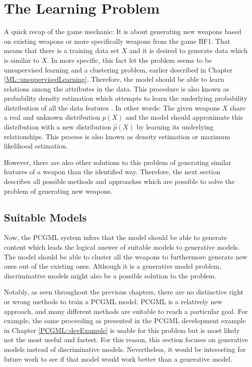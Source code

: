 \documentclass[MGS,Master,english]{twbook}%
\begin{document}
\section{The Learning Problem}
A quick recap of the game mechanic: It is about generating new weapons based on existing weapons or more specifically weapons from the game \ac{BF1}. That means that there is a training data set $X$ and it is desired to generate data which is similar to $X$. In more specific, this fact let the problem seems to be unsupervised learning and a clustering problem, earlier described in Chapter \ref{ML::unsupervisedLearning}. Therefore, the model should be able to learn relations among the attributes in the data. This procedure is also known as probability density estimation which attempts to learn the underlying probability distribution of all the data features \cite{ml::vae::tutorial}. In other words: The given weapons $X$ share a real and unknown distribution $p(X)$ and the model should approximate this distribution with a new distribution $\hat{p}(X)$ by learning its underlying relationships. This process is also known as density estimation or maximum likelihood estimation. 

However, there are also other solutions to this problem of generating similar features of a weapon than the identified way. Therefore, the next section describes all possible methods and approaches which are possible to solve the problem of generating new weapons.

\subsection{Suitable Models}
Now, the PCGML system infers that the model should be able to generate content which leads the logical answer of suitable models to generative models. The model should be able to cluster all the weapons to furthermore generate new ones out of the existing ones. Although it is a generative model problem, discriminative models might also be a possible solution to the problem.

Notably, as seen throughout the previous chapters, there are no distinctive right or wrong methods to train a PCGML model. PCGML is a relatively new approach, and many different methods are suitable to reach a particular goal. For example, the same proceeding as presented in the PCGML development example in Chapter \ref{PCGML::devExample} is usable for this problem but is most likely not the most useful and fastest. For this reason, this section focuses on generative models instead of discriminative models. Nevertheless, it would be interesting for future work to see if that model would work better than a generative model. 
\end{document}
